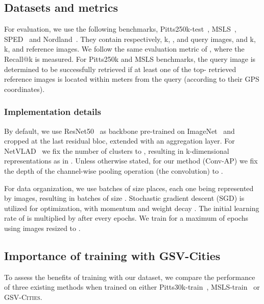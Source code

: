 \documentclass{article}
\begin{document}
\subsection{Datasets and metrics}\label{sec:exp:eval}
For evaluation, we use the following  benchmarks,  Pitts250k-test~\cite{torii2013visual}, MSLS~\cite{warburg2020mapillary}, SPED~\cite{zaffar2021vpr} and Nordland~\cite{zaffar2021vpr}. They contain respectively, k, ,  and  query images, and k, k,  and  reference images. We follow the same evaluation metric of \cite{arandjelovic2016netvlad, warburg2020mapillary, zaffar2021vpr}, where the Recall@k is measured. For Pitts250k and MSLS benchmarks, the query image is determined to be successfully retrieved if at least one of the top- retrieved reference images is located within  meters from the query (according to their GPS coordinates).

\subsubsection{Implementation details}
By default, we use ResNet50~\cite{he2016deep} as backbone pre-trained on ImageNet~\cite{russakovsky2015imagenet} and cropped at the last residual bloc, extended with an aggregation layer. For NetVLAD~\cite{arandjelovic2016netvlad} we fix the number of clusters to , resulting in k-dimensional representations as in \cite{arandjelovic2016netvlad, hausler2021patch}. Unless otherwise stated, for our method (Conv-AP) we fix the depth of the channel-wise pooling operation (the  convolution) to .

For data organization, we use batches of size  places, each one being represented by  images, resulting in batches of size . Stochastic gradient descent (SGD) is utilized for optimization, with momentum  and weight decay . The initial learning rate of  is multiplied by  after every  epochs.  We train for a maximum of  epochs using images resized to .

\subsection{Importance of training with GSV-Cities}
\label{sec:exp:netvlad}
To assess the benefits of training with our dataset, we compare the performance of three existing methods when trained on either Pitts30k-train~\cite{torii2013visual}, MSLS-train~\cite{warburg2020mapillary} or \textsc{GSV-Cities}.
\end{document}
